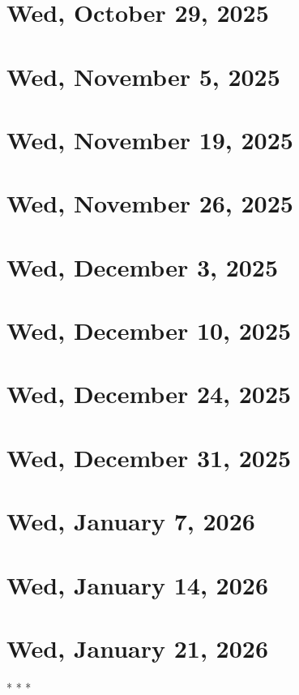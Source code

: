 \documentclass[a4paper]{report}
\institute{Technion}
\date{Based on lectures by \profloc{} in 2025--26
\\ Notes created by Daniel Haim Breger
\\~\\ Updated \today}
\begin{document}
\renewcommand\thepage{Title}
\maketitle
\renewcommand\thepage{Preface}


\newpage
\pagestyle{plain}
\tableofcontents
\newpage
\pagestyle{head}

\chapter{Wed, October 29, 2025}


\chapter{Wed, November 5, 2025}


\chapter{Wed, November 19, 2025}


\chapter{Wed, November 26, 2025}


\chapter{Wed, December 3, 2025}


\chapter{Wed, December 10, 2025}


\chapter{Wed, December 24, 2025}


\chapter{Wed, December 31, 2025}


\chapter{Wed, January 7, 2026}


\chapter{Wed, January 14, 2026}


\chapter{Wed, January 21, 2026}


%
\centering
* * *
%
\end{document}
